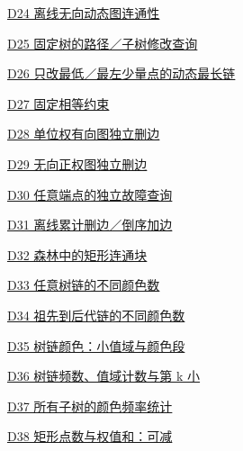 \documentclass[10pt,a4paper]{article}
\begin{document}
\noindent\hyperref[D24]{D24 离线无向动态图连通性\nobreak\hfill\pageref*{D24}}\par\vspace{1.5pt}
\noindent\hyperref[D25]{D25 固定树的路径／子树修改查询\nobreak\hfill\pageref*{D25}}\par\vspace{1.5pt}
\noindent\hyperref[D26]{D26 只改最低／最左少量点的动态最长链\nobreak\hfill\pageref*{D26}}\par\vspace{1.5pt}
\noindent\hyperref[D27]{D27 固定相等约束\nobreak\hfill\pageref*{D27}}\par\vspace{1.5pt}
\noindent\hyperref[D28]{D28 单位权有向图独立删边\nobreak\hfill\pageref*{D28}}\par\vspace{1.5pt}
\noindent\hyperref[D29]{D29 无向正权图独立删边\nobreak\hfill\pageref*{D29}}\par\vspace{1.5pt}
\noindent\hyperref[D30]{D30 任意端点的独立故障查询\nobreak\hfill\pageref*{D30}}\par\vspace{1.5pt}
\noindent\hyperref[D31]{D31 离线累计删边／倒序加边\nobreak\hfill\pageref*{D31}}\par\vspace{1.5pt}
\noindent\hyperref[D32]{D32 森林中的矩形连通块\nobreak\hfill\pageref*{D32}}\par\vspace{1.5pt}
\noindent\hyperref[D33]{D33 任意树链的不同颜色数\nobreak\hfill\pageref*{D33}}\par\vspace{1.5pt}
\noindent\hyperref[D34]{D34 祖先到后代链的不同颜色数\nobreak\hfill\pageref*{D34}}\par\vspace{1.5pt}
\noindent\hyperref[D35]{D35 树链颜色：小值域与颜色段\nobreak\hfill\pageref*{D35}}\par\vspace{1.5pt}
\noindent\hyperref[D36]{D36 树链频数、值域计数与第 k 小\nobreak\hfill\pageref*{D36}}\par\vspace{1.5pt}
\noindent\hyperref[D37]{D37 所有子树的颜色频率统计\nobreak\hfill\pageref*{D37}}\par\vspace{1.5pt}
\noindent\hyperref[D38]{D38 矩形点数与权值和：可减\nobreak\hfill\pageref*{D38}}\par\vspace{1.5pt}
\end{document}
